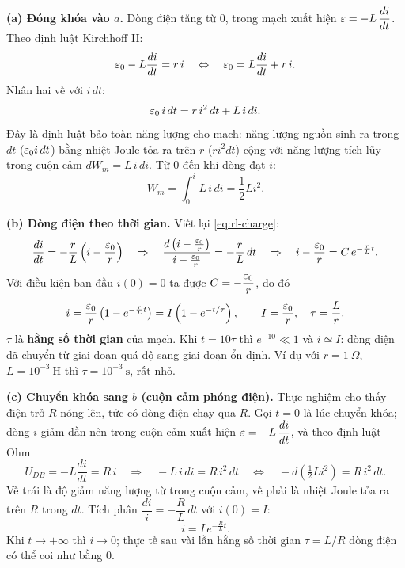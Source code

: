 \begin{enumerate}
\textbf{(a) Đóng khóa vào $a$.} Dòng điện tăng từ 0, trong mạch xuất hiện $\varepsilon = -L\,\dfrac{di}{dt}$. Theo định luật Kirchhoff II:
\begin{equation}\label{eq:rl-charge}
\varepsilon_0 - L\frac{di}{dt} = r\,i
\quad\Leftrightarrow\quad
\varepsilon_0 = L\frac{di}{dt} + r\,i.
\end{equation}
Nhân hai vế với $i\,dt$:
\[
\varepsilon_0\,i\,dt = r\,i^2\,dt + L\,i\,di.
\]
Đây là định luật bảo toàn năng lượng cho mạch: năng lượng nguồn sinh ra trong $dt$ ($\varepsilon_0 i\,dt$) bằng nhiệt Joule tỏa ra trên $r$ ($r i^2 dt$) cộng với năng lượng tích lũy trong cuộn cảm $dW_m = L\,i\,di$. Từ $0$ đến khi dòng đạt $i$:
\[
\boxed{W_m = \int_0^i L\,i\,di = \frac12 L i^2}.
\]

\textbf{(b) Dòng điện theo thời gian.} Viết lại \cref{eq:rl-charge}:
\[
\frac{di}{dt} = -\frac{r}{L}\left(i - \frac{\varepsilon_0}{r}\right)
\quad\Rightarrow\quad
\frac{d\left(i - \frac{\varepsilon_0}{r}\right)}{i - \frac{\varepsilon_0}{r}} = -\frac{r}{L}\,dt
\quad\Rightarrow\quad
i - \frac{\varepsilon_0}{r} = C\,e^{-\frac{r}{L}t}.
\]
Với điều kiện ban đầu $i(0) = 0$ ta được $C = -\dfrac{\varepsilon_0}{r}$, do đó
\[
i = \frac{\varepsilon_0}{r}\left(1 - e^{-\frac{r}{L}t}\right) = I\left(1 - e^{-t/\tau}\right),
\qquad
I = \frac{\varepsilon_0}{r},\quad \tau = \frac{L}{r}.
\]
$\tau$ là \textbf{hằng số thời gian} của mạch. Khi $t = 10\tau$ thì $e^{-10} \ll 1$ và $i \simeq I$: dòng điện đã chuyển từ giai đoạn quá độ sang giai đoạn ổn định. Ví dụ với $r = 1\ \Omega$, $L = 10^{-3}\ \text{H}$ thì $\tau = 10^{-3}\ \text{s}$, rất nhỏ.

\textbf{(c) Chuyển khóa sang $b$ (cuộn cảm phóng điện).} Thực nghiệm cho thấy điện trở $R$ nóng lên, tức có dòng điện chạy qua $R$. Gọi $t = 0$ là lúc chuyển khóa; dòng $i$ giảm dần nên trong cuộn cảm xuất hiện $\varepsilon = -L\,\dfrac{di}{dt}$, và theo định luật Ohm
\[
U_{DB} = -L\frac{di}{dt} = R\,i
\quad\Rightarrow\quad
-L\,i\,di = R\,i^2\,dt
\quad\Leftrightarrow\quad
-d\left(\tfrac12 L i^2\right) = R\,i^2\,dt.
\]
Vế trái là độ giảm năng lượng từ trong cuộn cảm, vế phải là nhiệt Joule tỏa ra trên $R$ trong $dt$. Tích phân $\dfrac{di}{i} = -\dfrac{R}{L}\,dt$ với $i(0) = I$:
\[
i = I\,e^{-\frac{R}{L}t}.
\]
Khi $t \to +\infty$ thì $i \to 0$; thực tế sau vài lần hằng số thời gian $\tau = L/R$ dòng điện có thể coi như bằng 0.
\end{enumerate}
